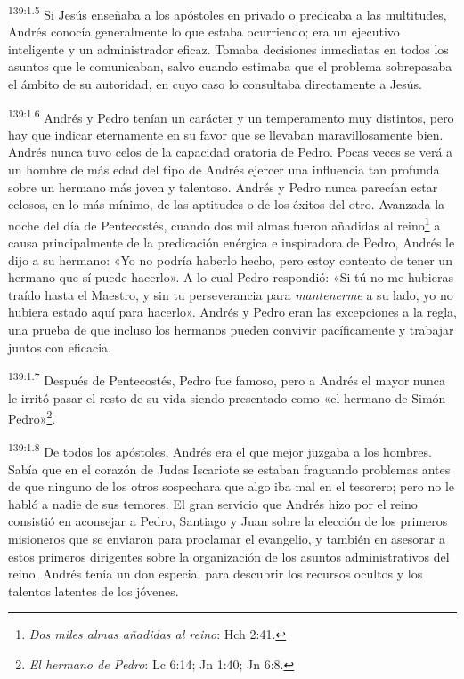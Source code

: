 \par 
\textsuperscript{139:1.5} Si Jesús enseñaba a los apóstoles en privado o predicaba a las multitudes, Andrés conocía generalmente lo que estaba ocurriendo; era un ejecutivo inteligente y un administrador eficaz. Tomaba decisiones inmediatas en todos los asuntos que le comunicaban, salvo cuando estimaba que el problema sobrepasaba el ámbito de su autoridad, en cuyo caso lo consultaba directamente a Jesús.

\par 
\textsuperscript{139:1.6} Andrés y Pedro tenían un carácter y un temperamento muy distintos, pero hay que indicar eternamente en su favor que se llevaban maravillosamente bien. Andrés nunca tuvo celos de la capacidad oratoria de Pedro. Pocas veces se verá a un hombre de más edad del tipo de Andrés ejercer una influencia tan profunda sobre un hermano más joven y talentoso. Andrés y Pedro nunca parecían estar celosos, en lo más mínimo, de las aptitudes o de los éxitos del otro. Avanzada la noche del día de Pentecostés, cuando dos mil almas fueron añadidas al reino\footnote{\textit{Dos miles almas añadidas al reino}: Hch 2:41.} a causa principalmente de la predicación enérgica e inspiradora de Pedro, Andrés le dijo a su hermano: «Yo no podría haberlo hecho, pero estoy contento de tener un hermano que sí puede hacerlo». A lo cual Pedro respondió: «Si tú no me hubieras traído hasta el Maestro, y sin tu perseverancia para \textit{mantenerme} a su lado, yo no hubiera estado aquí para hacerlo». Andrés y Pedro eran las excepciones a la regla, una prueba de que incluso los hermanos pueden convivir pacíficamente y trabajar juntos con eficacia.

\par 
\textsuperscript{139:1.7} Después de Pentecostés, Pedro fue famoso, pero a Andrés el mayor nunca le irritó pasar el resto de su vida siendo presentado como «el hermano de Simón Pedro»\footnote{\textit{El hermano de Pedro}: Lc 6:14; Jn 1:40; Jn 6:8.}.

\par 
\textsuperscript{139:1.8} De todos los apóstoles, Andrés era el que mejor juzgaba a los hombres. Sabía que en el corazón de Judas Iscariote se estaban fraguando problemas antes de que ninguno de los otros sospechara que algo iba mal en el tesorero; pero no le habló a nadie de sus temores. El gran servicio que Andrés hizo por el reino consistió en aconsejar a Pedro, Santiago y Juan sobre la elección de los primeros misioneros que se enviaron para proclamar el evangelio, y también en asesorar a estos primeros dirigentes sobre la organización de los asuntos administrativos del reino. Andrés tenía un don especial para descubrir los recursos ocultos y los talentos latentes de los jóvenes.

